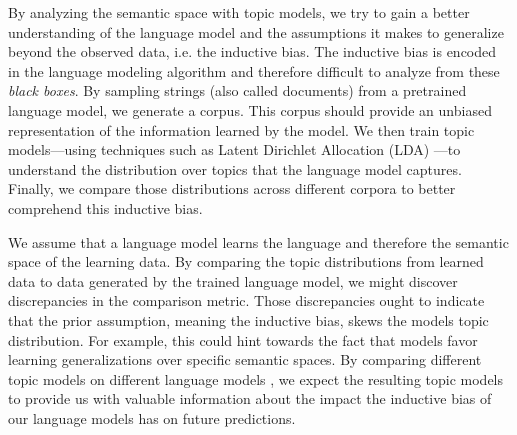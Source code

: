 By analyzing the semantic space with topic models, we try to gain a better understanding of the language model and the assumptions it makes to generalize beyond the observed data, i.e. the inductive bias. The inductive bias is encoded in the language modeling algorithm and therefore difficult to analyze from these \textit{black boxes}. By sampling strings (also called documents) from a pretrained language model, we generate a corpus. This corpus should provide an unbiased representation of the information learned by the model. We then train topic models---using techniques such as Latent Dirichlet Allocation (LDA) \cite{blei2003latent}---to understand the distribution over topics that the language model captures. Finally, we compare those distributions across different corpora to better comprehend this inductive bias.

We assume that a language model learns the language and therefore the semantic space of the learning data. By comparing the topic distributions from learned data to data generated by the trained language model, we might discover discrepancies in the comparison metric. Those discrepancies ought to indicate that the prior assumption, meaning the inductive bias, skews the models topic distribution. For example, this could hint towards the fact that models favor learning generalizations over specific semantic spaces. By comparing different topic models \cite{blei2003latent, neuralLDA} on different language models \cite{gpt-2, transformer-xl}, we expect the resulting topic models to provide us with valuable information about the impact the inductive bias of our language models has on future predictions.

